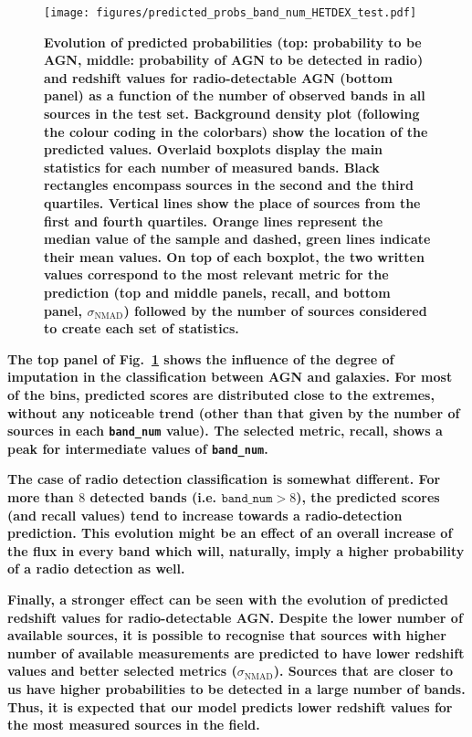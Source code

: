 \documentclass{aa}
\begin{document}
\begin{figure}
  \centering
    \texttt{[image: figures/predicted\_probs\_band\_num\_HETDEX\_test.pdf]}
  \caption{\textbf{Evolution of predicted probabilities (top: probability to be AGN, middle: probability of AGN to be detected in radio) and redshift values for radio-detectable AGN (bottom panel) as a function of the number of observed bands in all sources in the test set. Background density plot (following the colour coding in the colorbars) show the location of the predicted values. Overlaid boxplots display the main statistics for each number of measured bands. Black rectangles encompass sources in the second and the third quartiles. Vertical lines show the place of sources from the first and fourth quartiles. Orange lines represent the median value of the sample and dashed, green lines indicate their mean values. On top of each boxplot, the two written values correspond to the most relevant metric for the prediction (top and middle panels, recall, and bottom panel, $\sigma_{\mathrm{NMAD}}$) followed by the number of sources considered to create each set of statistics.}}
  \label{fig:probs_band_num_test}
\end{figure}

\textbf{The top panel of Fig.~\ref{fig:probs_band_num_test} shows the influence of the degree of imputation in the classification between AGN and galaxies. For most of the bins, predicted scores are distributed close to the extremes, without any noticeable trend (other than that given by the number of sources in each \texttt{band\_num} value). The selected metric, recall, shows a peak for intermediate values of \texttt{band\_num}.}

\textbf{The case of radio detection classification is somewhat different. For more than $8$ detected bands (i.e. $\mathtt{band\_num} > 8$), the predicted scores (and recall values) tend to increase towards a radio-detection prediction. This evolution might be an effect of an overall increase of the flux in every band which will, naturally, imply a higher probability of a radio detection as well.}

\textbf{Finally, a stronger effect can be seen with the evolution of predicted redshift values for radio-detectable AGN. Despite the lower number of available sources, it is possible to recognise that sources with higher number of available measurements are predicted to have lower redshift values and better selected metrics ($\sigma_{\mathrm{NMAD}}$). Sources that are closer to us have higher probabilities to be detected in a large number of bands. Thus, it is expected that our model predicts lower redshift values for the most measured sources in the field.}
\end{document}
